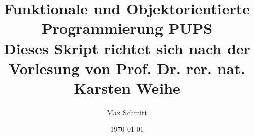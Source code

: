 \documentclass[a4paper,12pt,liststotoc, parskip=half]{scrreprt}
\begin{document}
    \pagestyle{fancy}
    
    \title{%
      Funktionale und Objektorientierte Programmierung PUPS \\
      \large Dieses Skript richtet sich nach der Vorlesung von Prof. Dr. rer. nat. Karsten Weihe}
    
    \date{\today}
    \author{Max Schmitt}
    \maketitle
    \cleardoubleoddpage{}
    
    \pagestyle{fancy}
    
    \lhead{}
    \chead{ \leftmark}
    \rhead{}
    
    \cfoot{\thepage}
    \rfoot{ %
    \date{\today} }
    
    \begingroup
      \renewcommand*{\chapterpagestyle}{empty}
      \pagestyle{empty}
      \tableofcontents
    \endgroup
    
    
    \clearpage
    
    

    \appendix
    
    
\end{document}
